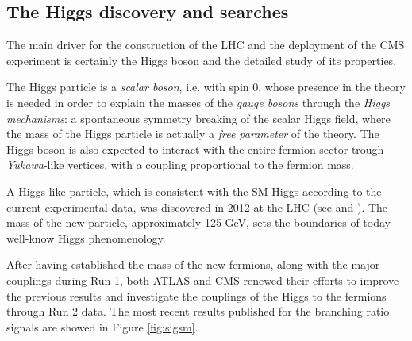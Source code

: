 \subsection{The Higgs discovery and searches}

The main driver for the construction of the LHC and the deployment of the CMS experiment is certainly the Higgs boson and the detailed study of its properties. 


The Higgs particle is a \emph{scalar boson}, i.e. with spin $0$, whose presence in the theory is needed in order to explain the masses of the \emph{gauge bosons} through the \emph{Higgs mechanisms}: a spontaneous symmetry breaking of the scalar Higgs field, where the mass of the Higgs particle is actually a \emph{free parameter} of the theory. The Higgs boson is also expected to  interact with the entire fermion sector trough \emph{Yukawa}-like vertices, with a coupling proportional to the fermion mass.

A Higgs-like particle, which is consistent with the SM Higgs according to the current experimental data, was discovered in 2012 at the LHC (see \cite{Aad_2012} and \cite{Chatrchyan_2012}). The mass of the new particle, approximately 125 GeV, sets the boundaries of today well-know Higgs phenomenology.

After having established the mass of the new fermions, along with the major couplings during Run 1, both ATLAS and CMS renewed their efforts to improve the previous results and investigate the couplings of the Higgs to the fermions through Run 2 data. The most recent results published for the branching ratio signals are showed in Figure \ref{fig:sigsm}.


